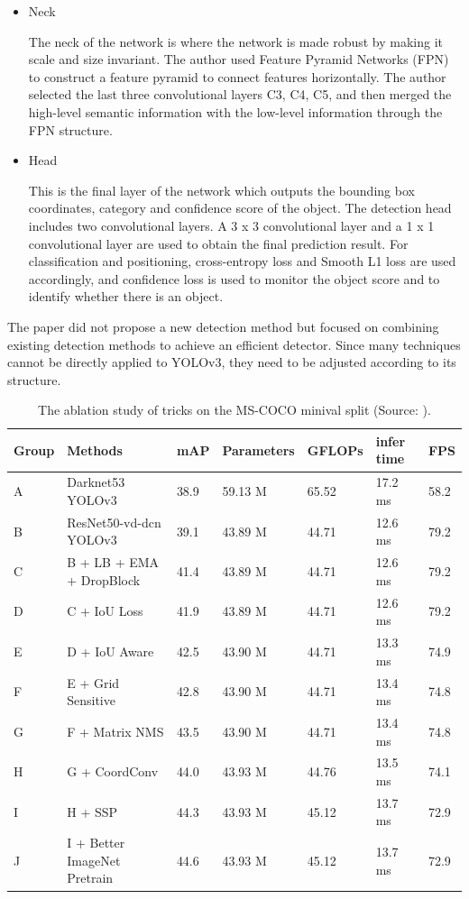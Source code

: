 \documentclass[sensors,article,submit,moreauthors,pdftex]{Definitions/mdpi}
\begin{document}
\begin{itemize}
\item{Neck}

The neck of the network is where the network is made robust by making it scale and size invariant. The author used Feature Pyramid Networks (FPN) to construct a feature pyramid to connect features horizontally. The author selected the last three convolutional layers C3, C4, C5, and then merged the high-level semantic information with the low-level information through the FPN structure.

\end{itemize}


\begin{itemize}

\item{Head}

This is the final layer of the network which outputs the bounding box coordinates, category and confidence score of the object. The detection head includes two convolutional layers. A 3 x 3 convolutional layer and a 1 x 1 convolutional layer are used to obtain the final prediction result. For classification and positioning, cross-entropy loss and Smooth L1 loss are used accordingly, and confidence loss is used to monitor the object score and to identify whether there is an object.
\end{itemize}

The paper did not propose a new detection method but focused on combining existing detection methods to achieve an efficient detector. Since many techniques cannot be directly applied to YOLOv3, they need to be adjusted according to its structure.

\begin{table}[htbp]
\centering
\caption{The ablation study of tricks on the MS-COCO minival split (Source: \cite{long2020pp}).}
\begin{tabular}{lp{3cm}<{}lllll} 
\toprule
\textbf{Group}&\textbf{Methods}&\textbf{mAP}&\textbf{Parameters}&\textbf{GFLOPs}&\textbf{infer time}&\textbf{FPS}\\
\midrule
A& Darknet53 YOLOv3 &38.9 & 59.13 M& 65.52 & 17.2 ms &58.2\\
\cmidrule(r){1-7}
B& ResNet50-vd-dcn YOLOv3 &39.1 & 43.89 M & 44.71 & 12.6 ms & 79.2\\
C& B + LB + EMA + DropBlock& 41.4 & 43.89 M & 44.71 & 12.6 ms &79.2\\
D& C + IoU Loss& 41.9 & 43.89 M & 44.71 & 12.6 ms &79.2\\
E& D + IoU Aware & 42.5 & 43.90 M & 44.71 & 13.3 ms &74.9\\
F& E + Grid Sensitive& 42.8 & 43.90 M & 44.71 & 13.4 ms &74.8\\
G& F + Matrix NMS& 43.5 & 43.90 M & 44.71 & 13.4 ms &74.8\\
H& G + CoordConv& 44.0 & 43.93 M & 44.76 & 13.5 ms &74.1\\
I& H + SSP& 44.3 & 43.93 M & 45.12 & 13.7 ms &72.9\\
J& I + Better ImageNet Pretrain& 44.6& 43.93 M & 45.12 & 13.7 ms& 72.9\\
\bottomrule
\end{tabular}
\label{tbl:ablation study pp-yolo}
\end{table}
\end{document}
